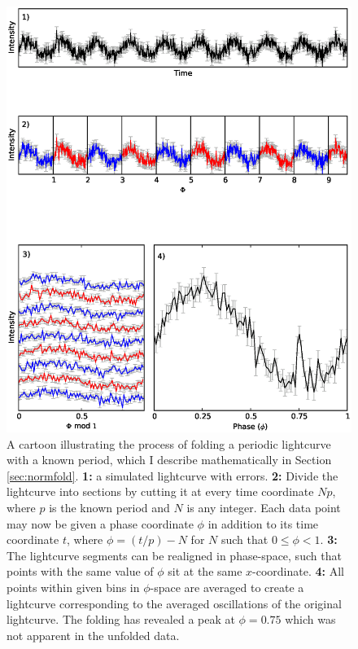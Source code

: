 \begin{figure}
    \includegraphics[width=\columnwidth, trim = 0mm 20mm 0mm 135mm,clip]{images/folding.eps}
    \captionsetup{singlelinecheck=off}
    \caption[A cartoon illustrating the process of folding a periodic lightcurve with a known period.]{A cartoon illustrating the process of folding a periodic lightcurve with a known period, which I describe mathematically in Section \ref{sec:normfold}.  \textbf{1:} a simulated lightcurve with errors.  \textbf{2:} Divide the lightcurve into sections by cutting it at every time coordinate $Np$, where $p$ is the known period and $N$ is any integer.  Each data point may now be given a phase coordinate $\phi$ in addition to its time coordinate $t$, where $\phi=(t/p)-N$ for $N$ such that $0\leq\phi<1$.  \textbf{3:} The lightcurve segments can be realigned in phase-space, such that points with the same value of $\phi$ sit at the same $x$-coordinate.  \textbf{4:} All points within given bins in $\phi$-space are averaged to create a lightcurve corresponding to the averaged oscillations of the original lightcurve.  The folding has revealed a peak at $\phi=0.75$ which was not apparent in the unfolded data.}
   \label{fig:Folding}
\end{figure}

